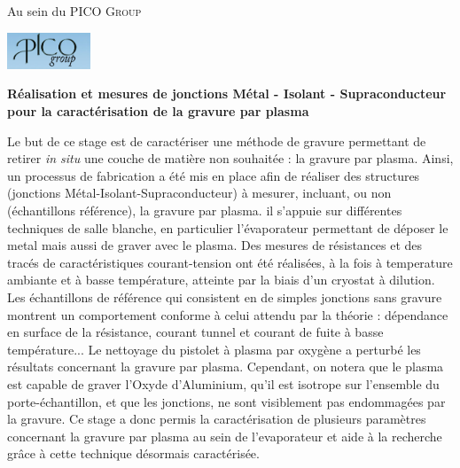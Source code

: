 \documentclass[a4paper,11pt]{article}
\begin{document}
\begin{center}
    \vspace{0.3cm}
    
    Au sein du PICO \textsc{Group}
    \vspace{0.5cm}
    
    \includegraphics[width=25mm]{logopico.png}
    \vspace{1cm}
    
       \end{center} 

    \newpage
    
    \begin{Large}
    \textbf{Réalisation et mesures de jonctions Métal - Isolant - Supraconducteur pour la caractérisation de la gravure par plasma}
\end{Large}

\vspace{0.3cm}

Le but de ce stage est de caractériser une méthode de gravure permettant de retirer \textit{in situ} une couche de matière non souhaitée : la gravure par plasma. Ainsi, un processus de fabrication a été mis en place afin de réaliser des structures (jonctions Métal-Isolant-Supraconducteur) à mesurer, incluant, ou non (échantillons référence), la gravure par plasma. il s'appuie sur différentes techniques de salle blanche, en particulier l'évaporateur permettant de déposer le metal mais aussi de graver avec le plasma. Des mesures de résistances et des tracés de caractéristiques courant-tension ont été réalisées, à la fois à temperature ambiante et à basse température, atteinte par la biais d'un cryostat à dilution. Les échantillons de référence qui consistent en de simples jonctions sans gravure montrent un comportement conforme à celui attendu par la théorie : dépendance en surface de la résistance, courant tunnel et courant de fuite à basse température... Le nettoyage du pistolet à plasma par oxygène a perturbé les résultats concernant la gravure par plasma. Cependant, on notera que le plasma est capable de graver l'Oxyde d'Aluminium, qu'il est isotrope sur l'ensemble du porte-échantillon, et que les jonctions, ne sont visiblement pas endommagées par la gravure. Ce stage a donc permis la caractérisation de plusieurs paramètres concernant la gravure par plasma au sein de l'evaporateur et aide à la recherche grâce à cette technique désormais caractérisée.

    
\end{document}
